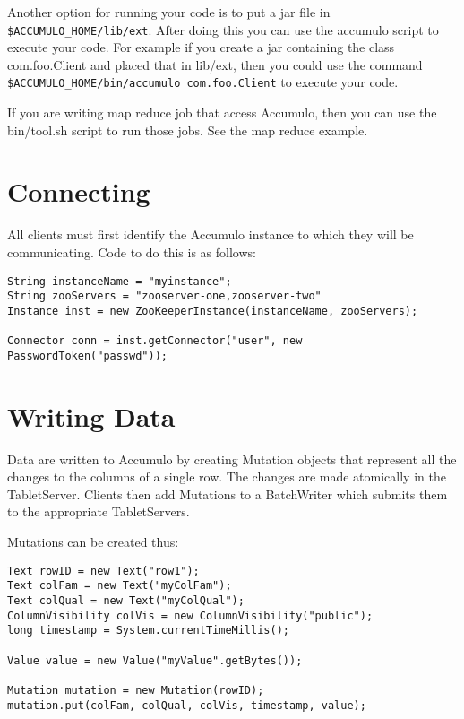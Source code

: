 Another option for running your code is to put a jar file in
\texttt{\$ACCUMULO\_HOME/lib/ext}. After doing this you can use the accumulo
script to execute your code. For example if you create a jar containing the
class com.foo.Client and placed that in lib/ext, then you could use the command
\texttt{\$ACCUMULO\_HOME/bin/accumulo com.foo.Client} to execute your code.

If you are writing map reduce job that access Accumulo, then you can use the
bin/tool.sh script to run those jobs. See the map reduce example.

\section{Connecting}

All clients must first identify the Accumulo instance to which they will be
communicating. Code to do this is as follows:

\begingroup\fontsize{8pt}{8pt}\selectfont\begin{verbatim}
String instanceName = "myinstance";
String zooServers = "zooserver-one,zooserver-two"
Instance inst = new ZooKeeperInstance(instanceName, zooServers);

Connector conn = inst.getConnector("user", new PasswordToken("passwd"));
\end{verbatim}\endgroup

\section{Writing Data}

Data are written to Accumulo by creating Mutation objects that represent all the
changes to the columns of a single row. The changes are made atomically in the
TabletServer. Clients then add Mutations to a BatchWriter which submits them to
the appropriate TabletServers.

Mutations can be created thus:

\begingroup\fontsize{8pt}{8pt}\selectfont\begin{verbatim}
Text rowID = new Text("row1");
Text colFam = new Text("myColFam");
Text colQual = new Text("myColQual");
ColumnVisibility colVis = new ColumnVisibility("public");
long timestamp = System.currentTimeMillis();

Value value = new Value("myValue".getBytes());

Mutation mutation = new Mutation(rowID);
mutation.put(colFam, colQual, colVis, timestamp, value);
\end{verbatim}\endgroup

